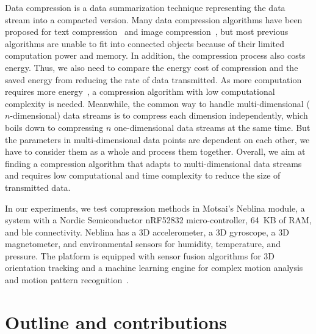 Data compression is a data summarization technique representing the data
stream into a compacted version. Many data compression algorithms have been
proposed for text compression~\cite{shanmugasundaram2011comparative,
sayood2017introduction} and image compression~\cite{shum2003survey,
zaineldin2015image}, but most previous algorithms are unable to fit into
connected objects because of their limited computation power and memory. In
addition, the compression process also costs energy. Thus, we also need to
compare the energy cost of compression and the saved energy from reducing the
rate of data transmitted. As more computation requires more
energy~\cite{pope2018accelerometer}, a compression algorithm with low
computational complexity is needed.  Meanwhile, the common way to handle
multi-dimensional ($n$-dimensional) data streams is to compress each dimension
independently, which boils down to compressing $n$ one-dimensional data streams at the
same time. But the parameters in multi-dimensional data points are dependent on
each other, we have to consider them as a whole and process them together.
Overall, we aim at finding a compression algorithm that adapts to
multi-dimensional data streams and requires low computational and time
complexity to reduce the size of transmitted data.


In our experiments, we test compression methods in Motsai's Neblina module, a
system with a Nordic Semiconductor nRF52832 micro-controller, 64~KB of RAM, and
\acrlong{ble} connectivity. Neblina has a 3D accelerometer, a 3D
gyroscope, a 3D magnetometer, and environmental sensors for humidity,
temperature, and pressure. The platform is equipped with sensor fusion algorithms
for 3D orientation tracking and a machine learning engine for complex motion
analysis and motion pattern recognition~\cite{sarbishei2016accuracy}.


\section{Outline and contributions}




